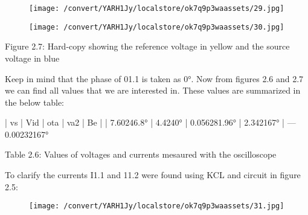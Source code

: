 \documentclass[12pt]{report}
\begin{document}
\vspace{10pt}

\begin{figure}[h]

\texttt{[image: /convert/YARH1Jy/localstore/ok7q9p3waassets/29.jpg]}

\centering

\end{figure}

\par

\vspace{10pt}

\begin{figure}[h]

\texttt{[image: /convert/YARH1Jy/localstore/ok7q9p3waassets/30.jpg]}

\centering

\end{figure}

    Figure 2.7: Hard-copy showing the reference voltage in yellow and the source  voltage in blue 

\vspace{10pt}

    Keep in mind that the phase of 01.1 is taken as 0°. Now from figures 2.6  and 2.7 we can find all values that we are interested in. These values are  summarized in the below table: 

\vspace{10pt}

    | vs | Vid | ota | va2 | Be |  | 7.60246.8° | 4.4240° | 0.056281.96° | 2.342167° | —0.00232167°                              

\vspace{10pt}

    Table 2.6: Values of voltages and currents mesaured with the oscilloscope 

\vspace{10pt}

    To clarify the currents I1.1 and 11.2 were found using KCL and circuit in  figure 2.5: 

\vspace{10pt}

\begin{figure}[h]

\texttt{[image: /convert/YARH1Jy/localstore/ok7q9p3waassets/31.jpg]}

\centering

\end{figure}
\end{document}
